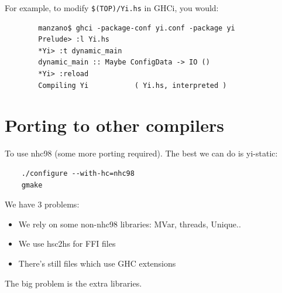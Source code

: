 \documentclass[]{article}
\newcommand{\code}[1]{\texttt{#1}}
\begin{document}
For example, to modify \code{\$(TOP)/Yi.hs} in GHCi, you would:

{\small
\begin{verbatim}
        manzano$ ghci -package-conf yi.conf -package yi
        Prelude> :l Yi.hs
        *Yi> :t dynamic_main
        dynamic_main :: Maybe ConfigData -> IO ()
        *Yi> :reload
        Compiling Yi           ( Yi.hs, interpreted )
\end{verbatim}
}

\section{Porting to other compilers}

To use nhc98 (some more porting required). The best we can do is
yi-static:
\begin{verbatim}
    ./configure --with-hc=nhc98
    gmake
\end{verbatim}

We have 3 problems:
\begin{itemize}
    \item We rely on some non-nhc98 libraries: MVar, threads, Unique..
    \item We use hsc2hs for FFI files
    \item There's still files which use GHC extensions
\end{itemize}

The big problem is the extra libraries.



\end{document}
